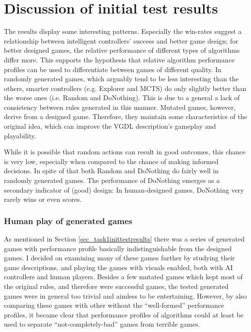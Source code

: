 \documentclass[a4paper,titlepage,final]{report}
\begin{document}
\section{Discussion of initial test results}
\label{sec_task1discussion}
The results display some interesting patterns. 
Especially the win-rates suggest a relationship between intelligent controllers' success and better game design; for better designed games, the relative performance of different types of algorithms differ more. 
This supports the hypothesis that relative algorithm performance profiles can be used to differentiate between games of different quality. 
In randomly generated games, which arguably tend to be less interesting than the others, smarter controllers (e.g. Explorer and MCTS) do only slightly better than the worse ones (i.e. Random and DoNothing). 
This is due to a general a lack of consistency between rules generated in this manner. 
Mutated games, however, derive from a designed game. 
Therefore, they maintain some characteristics of the original idea, which can improve the VGDL description's gameplay and playability. %

While it is possible that random actions can result in good outcomes, this chance is very low, especially when compared to the chance of making informed decisions. 
In spite of that both Random and DoNothing do fairly well in randomly generated games. 
The performance of DoNothing emerges as a secondary indicator of (good) design: 
In human-designed games, DoNothing very rarely wins or even scores.

\subsubsection*{Human play of generated games}
As mentioned in Section \ref{sec_task1inittestresults} there was a series of generated games with performance profile basically indistinguishable from the designed games.
I decided on examining many of these games further by studying their game descriptions, and playing the games with visuals enabled, both with AI controllers and human players. 
Besides a few mutated games which kept most of the original rules, and therefore were successful games, the tested generated games were in general too trivial and aimless to be entertaining.
However, by also comparing these games with other without the ``well-formed'' performance profiles, it became clear that performance profiles of algorithms could at least be used to separate ``not-completely-bad'' games from terrible games. 
\end{document}

